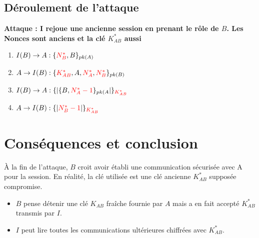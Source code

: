 \documentclass[11pt]{article}
\begin{document}
\subsection{Déroulement de l'attaque}

\textbf{Attaque : I rejoue une ancienne session en prenant le rôle de $B$. Les Nonces sont anciens et la clé $K_{AB}^*$ aussi}

\begin{enumerate}
    \item $I(B) \rightarrow A : \{\textcolor{red}{N_B^*},B\}_{pk(A)}$
    \item $A \rightarrow I(B) : \{\textcolor{red}{K_{AB}^*},A,\textcolor{red}{N_A^*},\textcolor{red}{N_B^*}\}_{pk(B)}$
    \item $I(B) \rightarrow A : \{|\{B,\textcolor{red}{N_A^* -1}\}_{pk(A}|\}_{\textcolor{red}{K_{AB}^*}}$
    \item $A \rightarrow I(B) : \{|\textcolor{red}{N_B^* -1}|\}_{\textcolor{red}{K_{AB}^*}}$
\end{enumerate}



\section{Conséquences et conclusion}

\noindent
À la fin de l'attaque, $B$ croit avoir établi une communication sécurisée avec A pour la session. En réalité, la clé utilisée est une clé ancienne $K_{AB}^*$ supposée compromise.

\begin{itemize}
    \item $B$ pense détenir une clé $K_{AB}$ fraîche fournie par $A$ mais a en fait accepté $K_{AB}^*$ transmis par $I$.
    \item $I$ peut lire toutes les communications ultérieures chiffrées avec $K_{AB}^*$.
\end{itemize}
\end{document}
